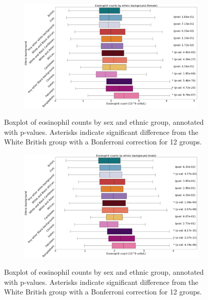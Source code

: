 \documentclass[12pt]{pnas-new}
\begin{document}
\begin{figure}
    \centering
    \begin{subfigure}{\textwidth}
    \includegraphics[width=\textwidth]{images/female_eosinophill_boxplot_annotated.pdf}
    \end{subfigure}
    \caption{Boxplot of eosinophil counts by sex and ethnic group, annotated with p-values. Asterisks indicate significant difference from the White British group with a Bonferroni correction for 12 groups.}
    \label{fig:supp_box_eosinophill_f}
\end{figure}

\begin{figure}
    \centering
    \begin{subfigure}{\textwidth}
    \includegraphics[width=\textwidth]{images/male_eosinophill_boxplot_annotated.pdf}
    \end{subfigure}
    \caption{Boxplot of eosinophil counts by sex and ethnic group, annotated with p-values. Asterisks indicate significant difference from the White British group with a Bonferroni correction for 12 groups.}
    \label{fig:supp_box_eosinophill_m}
\end{figure}
\end{document}
